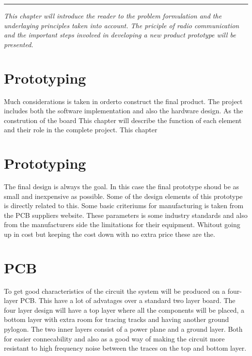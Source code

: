 \vspace{-10ex}%
\rule{\textwidth}{0.3pt}
\vspace{5ex}

\textit{
This chapter will introduce the reader to the problem formulation and the underlaying principles taken into account. The priciple of radio communication and the important steps involved in developing a new product prototype will be presented.
}
\vspace{5ex}

\section{Prototyping}
Much considerations is taken in orderto construct the final product. The project includes both the software implementation and also the hardware design. As the constrution of the board 
This chapter will describe the function of each element and their role in the complete project. 
This chapter 



\section{Prototyping}
The final design is always the goal. In this case the final prototype shoud be as small and inexpensive as possible. Some of the design elements of this prototype is directly related to this. Some basic criteriums for manufacturing is taken from the PCB suppliers website. These parameters is some industry standards and also from the manufacturers side the limitations for their equipment. Whitout going up in cost but keeping the cost down with no extra price these are the.



\section{PCB}
To get good characteristics of the circuit the system will be produced on a four-layer PCB. This have a lot of advatages over a standard two layer board. The four layer design will have a top layer where all the components will be placed, a bottom layer with extra room for tracing tracks and having another ground pylogon. The two inner layers consist of a power plane and a ground layer. Both for easier connecability and also as a good way of making the circuit more resistant to high frequency noise between the traces on the top and bottom layer.



